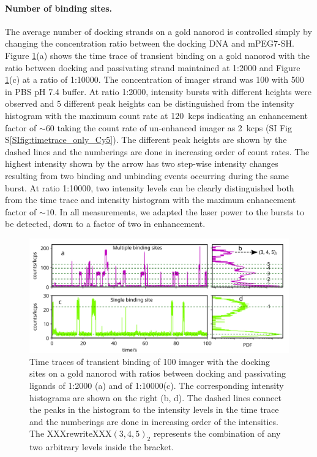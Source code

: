 \paragraph{Number of binding sites.} The average number of docking strands on a gold nanorod is controlled simply by changing the concentration ratio between the docking DNA and mPEG7-SH.
Figure \ref{fig:timetrace1vsmany}(a) shows the time trace of transient binding on a gold nanorod with the ratio between docking and passivating strand maintained at 1:2000 and Figure \ref{fig:timetrace1vsmany}(c) at a ratio of 1:10000.
The concentration of imager strand was \SI{100}{\nM} with \SI{500}{\mM}  in PBS pH 7.4 buffer.
At ratio 1:2000, intensity bursts with different heights were observed and $5$ different peak heights can be distinguished from the intensity histogram with the maximum count rate at \SI{120}{ kcps} indicating an enhancement factor of $\sim60$ taking the count rate of un-enhanced imager as \SI{2} { kcps} (SI Fig S\ref{SIfig:timetrace_only_Cy5}).
The different peak heights are shown by the dashed lines and the numberings are done in increasing order of count rates.
The highest intensity shown by the arrow has two step-wise intensity changes resulting from two binding and unbinding events occurring during the same burst.
At ratio 1:10000, two intensity levels can be clearly distinguished both from the time trace and intensity histogram with the maximum enhancement factor of $\sim10$.
In all measurements, we adapted the laser power to the bursts to be detected, down to a factor of two in enhancement.
\begin{figure}[ht]
	\centering
	\includegraphics[width=\textwidth]{timetrace1vsmany}%
	\caption{Time traces of transient binding of \SI{100}{\nM} imager with the docking sites on a gold nanorod with ratios between docking and passivating ligands of 1:2000 (a) and of 1:10000(c).
	The corresponding intensity histograms are shown on the right (b, d).
	The dashed lines connect the peaks in the histogram to the intensity levels in the time trace and the numberings are done in increasing order of the intensities.
	The XXXrewriteXXX$(3, 4, 5)_2$ represents the combination of any two arbitrary levels inside the bracket. 
	}
  	\label{fig:timetrace1vsmany}
\end{figure}

